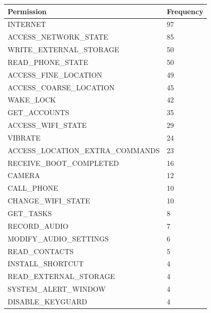 \begin{table}[]
\centering
\begin{tabular}{|l|l|}
\hline
\textbf{Permission}               & \textbf{Frequency} \\ \hline
INTERNET                          & 97                 \\ \hline
ACCESS\_NETWORK\_STATE            & 85                 \\ \hline
WRITE\_EXTERNAL\_STORAGE          & 50                 \\ \hline
READ\_PHONE\_STATE                & 50                 \\ \hline
ACCESS\_FINE\_LOCATION            & 49                 \\ \hline
ACCESS\_COARSE\_LOCATION          & 45                 \\ \hline
WAKE\_LOCK                        & 42                 \\ \hline
GET\_ACCOUNTS                     & 35                 \\ \hline
ACCESS\_WIFI\_STATE               & 29                 \\ \hline
VIBRATE                           & 24                 \\ \hline
ACCESS\_LOCATION\_EXTRA\_COMMANDS & 23                 \\ \hline
RECEIVE\_BOOT\_COMPLETED          & 16                 \\ \hline
CAMERA                            & 12                 \\ \hline
CALL\_PHONE                       & 10                 \\ \hline
CHANGE\_WIFI\_STATE               & 10                 \\ \hline
GET\_TASKS                        & 8                  \\ \hline
RECORD\_AUDIO                     & 7                  \\ \hline
MODIFY\_AUDIO\_SETTINGS           & 6                  \\ \hline
READ\_CONTACTS                    & 5                  \\ \hline
INSTALL\_SHORTCUT                 & 4                  \\ \hline
READ\_EXTERNAL\_STORAGE           & 4                  \\ \hline
SYSTEM\_ALERT\_WINDOW             & 4                  \\ \hline
DISABLE\_KEYGUARD                 & 4                  \\ \hline

\end{tabular}
\end{table}
